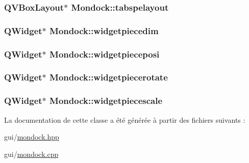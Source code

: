 \hypertarget{class_mondock_af59762fb339ae8c0821fada75433e8fb}{
\subsubsection[{tabspelayout}]{\setlength{\rightskip}{0pt plus 5cm}Q\+V\+Box\+Layout$\ast$ Mondock\+::tabspelayout\hspace{0.3cm}{\ttfamily [private]}}}\label{class_mondock_af59762fb339ae8c0821fada75433e8fb}
\hypertarget{class_mondock_abe21ad30be63590c6ce6e18969e9f082}{
\subsubsection[{widgetpiecedim}]{\setlength{\rightskip}{0pt plus 5cm}Q\+Widget$\ast$ Mondock\+::widgetpiecedim\hspace{0.3cm}{\ttfamily [private]}}}\label{class_mondock_abe21ad30be63590c6ce6e18969e9f082}
\hypertarget{class_mondock_a960802e2aa94a22487ff03bbaa102a02}{
\subsubsection[{widgetpieceposi}]{\setlength{\rightskip}{0pt plus 5cm}Q\+Widget$\ast$ Mondock\+::widgetpieceposi\hspace{0.3cm}{\ttfamily [private]}}}\label{class_mondock_a960802e2aa94a22487ff03bbaa102a02}
\hypertarget{class_mondock_af63f72dedf5afeaf073592a02800c5bd}{
\subsubsection[{widgetpiecerotate}]{\setlength{\rightskip}{0pt plus 5cm}Q\+Widget$\ast$ Mondock\+::widgetpiecerotate\hspace{0.3cm}{\ttfamily [private]}}}\label{class_mondock_af63f72dedf5afeaf073592a02800c5bd}
\hypertarget{class_mondock_ac94f8cc2fda714079ee5a9ae363fe052}{
\subsubsection[{widgetpiecescale}]{\setlength{\rightskip}{0pt plus 5cm}Q\+Widget$\ast$ Mondock\+::widgetpiecescale\hspace{0.3cm}{\ttfamily [private]}}}\label{class_mondock_ac94f8cc2fda714079ee5a9ae363fe052}


La documentation de cette classe a été générée à partir des fichiers suivants \+:\begin{DoxyCompactItemize}
\item 
gui/\hyperlink{mondock_8hpp}{mondock.\+hpp}\item 
gui/\hyperlink{mondock_8cpp}{mondock.\+cpp}\end{DoxyCompactItemize}
